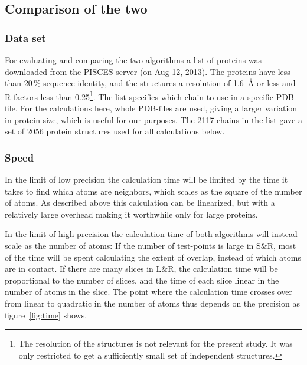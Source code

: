 \documentclass[a4paper,11pt]{article}
\begin{document}
\subsection{Comparison of the two}\label{sec:compare}

\subsubsection{Data set}\label{sec:dataset}

For evaluating and comparing the two algorithms a list of proteins was
downloaded from the PISCES server \cite{PISCES} (on Aug 12, 2013). The
proteins have less than 20\,\% sequence identity, and the structures a
resolution of 1.6~Å or less and R-factors less than 0.25\footnote{The
  resolution of the structures is not relevant for the present
  study. It was only restricted to get a sufficiently small set of
  independent structures.}. The list specifies which chain to use in a
specific PDB-file. For the calculations here, whole PDB-files are
used, giving a larger variation in protein size, which is useful for
our purposes. The 2117 chains in the list gave a set of 2056 protein
structures used for all calculations below.

\subsubsection{Speed}\label{sec:speed}

In the limit of low precision the calculation time will be limited by
the time it takes to find which atoms are neighbors, which scales as
the square of the number of atoms. As described above this calculation
can be linearized, but with a relatively large overhead making it
worthwhile only for large proteins.

In the limit of high precision the calculation time of both algorithms
will instead scale as the number of atoms: If the number of
test-points is large in S\&R, most of the time will be spent
calculating the extent of overlap, instead of which atoms are in
contact. If there are many slices in L\&R, the calculation time will
be proportional to the number of slices, and the time of each slice
linear in the number of atoms in the slice.  The point where the
calculation time crosses over from linear to quadratic in the number
of atoms thus depends on the precision as figure~\ref{fig:time} shows.
\end{document}

